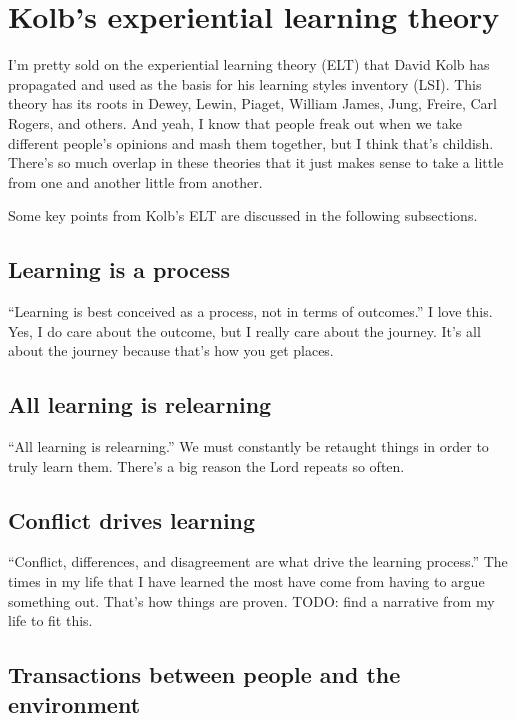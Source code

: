 \documentclass[man,natbib]{apa6}
\begin{document}
\section{Kolb's experiential learning theory}
I'm pretty sold on the experiential learning theory (ELT) that David Kolb has propagated \citep{kolb2005kolb} and used as the basis for his learning styles inventory (LSI). This theory has its roots in Dewey, Lewin, Piaget, William James, Jung, Freire, Carl Rogers, and others.
And yeah, I know that people freak out when we take different people's opinions and mash them together, but I think that's childish. There's so much overlap in these theories that it just makes sense to take a little from one and another little from another.

Some key points from Kolb's ELT are discussed in the following subsections.
\subsection{Learning is a process}
``Learning is best conceived as a process, not in terms of outcomes.'' I love this. Yes, I do care about the outcome, but I really care about the journey. It's all about the journey because that's how you get places.

\subsection{All learning is relearning}
``All learning is relearning.'' We must constantly be retaught things in order to truly learn them. There's a big reason the Lord repeats so often.

\subsection{Conflict drives learning}
``Conflict, differences, and disagreement are what drive the learning process.'' The times in my life that I have learned the most have come from having to argue something out. That's how things are proven. TODO: find a narrative from my life to fit this.

\subsection{Transactions between people and the environment}
\end{document}
